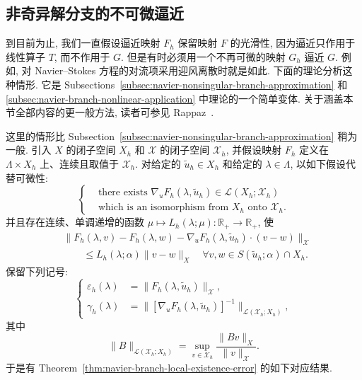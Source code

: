 \subsection{非奇异解分支的不可微逼近}
\label{subsec:navier-nondifferentiable-branches}

到目前为止, 我们一直假设逼近映射 $F_h$ 保留映射 $F$ 的光滑性,
因为逼近只作用于线性算子 $T$, 而不作用于 $G$. 但是有时必须用一个不再可微的映射
$G_h$ 逼近 $G$. 例如, 对 Navier--Stokes 方程的对流项采用迎风离散时就是如此.
下面的理论分析这种情形. 它是 Subsections~\ref{subsec:navier-nonsingular-branch-approximation}
和 \ref{subsec:navier-branch-nonlinear-application} 中理论的一个简单变体.
关于涵盖本节全部内容的更一般方法, 读者可参见 Rappaz~\cite{Rappaz1984}.

这里的情形比 Subsection~\ref{subsec:navier-nonsingular-branch-approximation}
稍为一般. 引入 $X$ 的闭子空间 $X_h$ 和 $\mathscr X$ 的闭子空间
$\mathscr X_h$, 并假设映射 $F_h$ 定义在 $\Lambda\times X_h$ 上、连续且取值于
$\mathscr X_h$. 对给定的 $\widetilde u_h\in X_h$ 和给定的
$\lambda\in\Lambda$, 以如下假设代替可微性:
\begin{equation}\label{eq:navier-branch-generalized-derivative-isomorphism}
\left\{
\begin{aligned}
&\text{there exists }\nabla_uF_h(\lambda,\widetilde u_h)
\in\mathcal L(X_h;\mathscr X_h)\\
&\text{which is an isomorphism from }X_h\text{ onto }\mathscr X_h.
\end{aligned}
\right.
\end{equation}
并且存在连续、单调递增的函数
$\mu\mapsto L_h(\lambda;\mu):\mathbb R_+\to\mathbb R_+$, 使
\begin{equation}\label{eq:navier-branch-generalized-lipschitz}
\begin{aligned}
&\|F_h(\lambda,v)-F_h(\lambda,w)
-\nabla_uF_h(\lambda,\widetilde u_h)\cdot(v-w)\|_{\mathscr X}\\
&\qquad\leq L_h(\lambda;\alpha)\|v-w\|_X
\quad\forall v,w\in S(\widetilde u_h;\alpha)\cap X_h.
\end{aligned}
\end{equation}
保留下列记号:
\begin{equation}\label{eq:navier-branch-generalized-local-quantities}
\left\{
\begin{aligned}
\varepsilon_h(\lambda)&=\|F_h(\lambda,\widetilde u_h)\|_{\mathscr X},\\
\gamma_h(\lambda)&=
\|[\nabla_uF_h(\lambda,\widetilde u_h)]^{-1}\|_{\mathcal L(\mathscr X_h;X_h)},
\end{aligned}
\right.
\end{equation}
其中
\[
\|B\|_{\mathcal L(\mathscr X_h;X_h)}
=\sup_{v\in\mathscr X_h}\frac{\|Bv\|_X}{\|v\|_{\mathscr X}}.
\]
于是有 Theorem~\ref{thm:navier-branch-local-existence-error} 的如下对应结果.

